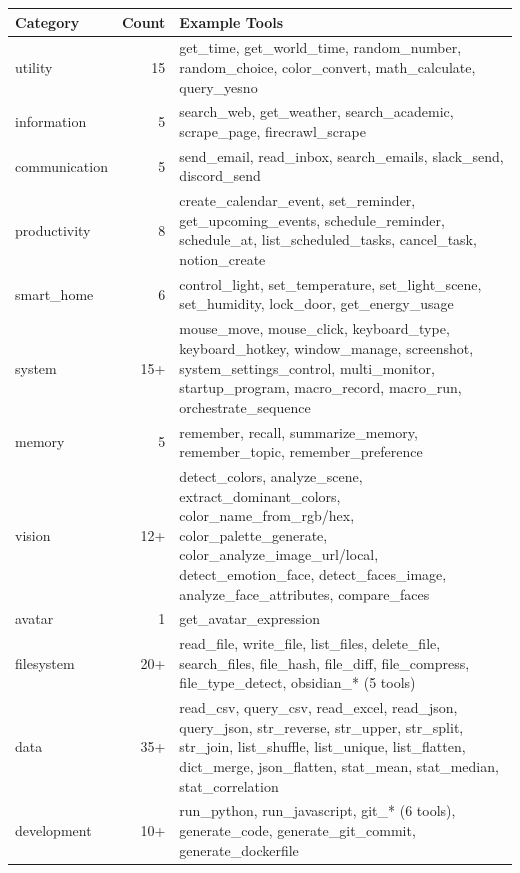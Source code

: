 \documentclass[12pt,a4paper,twoside]{report}
\begin{document}
\begin{table}[H]
\centering
{}
\begin{tabularx}{\textwidth}{|l|r|X|}
\hline
\rowcolor{phiblue!20}
\textbf{Category} & \textbf{Count} & \textbf{Example Tools} \\
\hline
utility & 15 & get\_time, get\_world\_time, random\_number, random\_choice, color\_convert, math\_calculate, query\_yesno \\
\hline
information & 5 & search\_web, get\_weather, search\_academic, scrape\_page, firecrawl\_scrape \\
\hline
communication & 5 & send\_email, read\_inbox, search\_emails, slack\_send, discord\_send \\
\hline
productivity & 8 & create\_calendar\_event, set\_reminder, get\_upcoming\_events, schedule\_reminder, schedule\_at, list\_scheduled\_tasks, cancel\_task, notion\_create \\
\hline
smart\_home & 6 & control\_light, set\_temperature, set\_light\_scene, set\_humidity, lock\_door, get\_energy\_usage \\
\hline
system & 15+ & mouse\_move, mouse\_click, keyboard\_type, keyboard\_hotkey, window\_manage, screenshot, system\_settings\_control, multi\_monitor, startup\_program, macro\_record, macro\_run, orchestrate\_sequence \\
\hline
memory & 5 & remember, recall, summarize\_memory, remember\_topic, remember\_preference \\
\hline
vision & 12+ & detect\_colors, analyze\_scene, extract\_dominant\_colors, color\_name\_from\_rgb/hex, color\_palette\_generate, color\_analyze\_image\_url/local, detect\_emotion\_face, detect\_faces\_image, analyze\_face\_attributes, compare\_faces \\
\hline
avatar & 1 & get\_avatar\_expression \\
\hline
filesystem & 20+ & read\_file, write\_file, list\_files, delete\_file, search\_files, file\_hash, file\_diff, file\_compress, file\_type\_detect, obsidian\_* (5 tools) \\
\hline
data & 35+ & read\_csv, query\_csv, read\_excel, read\_json, query\_json, str\_reverse, str\_upper, str\_split, str\_join, list\_shuffle, list\_unique, list\_flatten, dict\_merge, json\_flatten, stat\_mean, stat\_median, stat\_correlation \\
\hline
development & 10+ & run\_python, run\_javascript, git\_* (6 tools), generate\_code, generate\_git\_commit, generate\_dockerfile \\

\end{tabularx}
\end{table}
\end{document}
